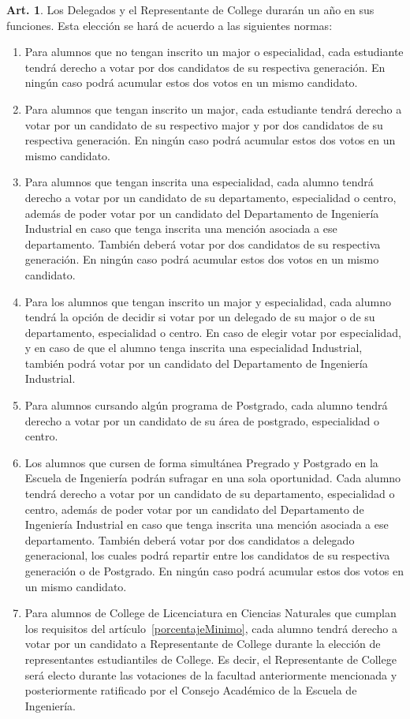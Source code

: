 \documentclass[letterpaper,11pt]{article}
\theoremstyle{definition}%
\newtheorem{art}{Art.} %
\begin{document}
\begin{art}\label{definicionesDelegados}
	Los Delegados y el Representante de College durarán un año en sus funciones. Esta elección se hará de acuerdo a las siguientes normas:
	\begin{enumerate}
		\item Para alumnos que no tengan inscrito un major o especialidad, cada estudiante tendrá derecho a votar por dos candidatos de su respectiva generación. En ningún caso podrá acumular estos dos votos en un mismo candidato.
		\item Para alumnos que tengan inscrito un major, cada estudiante tendrá derecho a votar por un candidato de su respectivo major y por dos candidatos de su respectiva generación. En ningún caso podrá acumular estos dos votos en un mismo candidato.
		\item Para alumnos que tengan inscrita una especialidad, cada alumno tendrá derecho a votar por un candidato de su departamento, especialidad o centro, además de poder votar por un candidato del Departamento de Ingeniería Industrial en caso que tenga inscrita una mención asociada a ese departamento. También deberá votar por dos candidatos de su respectiva generación. En ningún caso podrá acumular estos dos votos en un mismo candidato.
		\item Para los alumnos que tengan inscrito un major y especialidad, cada alumno tendrá la opción de decidir si votar por un delegado de su major o de su departamento, especialidad o centro. En caso de elegir votar por especialidad, y en caso de que el alumno tenga inscrita una especialidad Industrial, también podrá votar por un candidato del Departamento de Ingeniería Industrial.
		\item Para alumnos cursando algún programa de Postgrado, cada alumno tendrá derecho a votar por un candidato de su área de postgrado, especialidad o centro.
		\item Los alumnos que cursen de forma simultánea Pregrado y Postgrado en la Escuela de Ingeniería podrán sufragar en una sola oportunidad. Cada alumno tendrá derecho a votar por un candidato de su departamento, especialidad o centro, además de poder votar por un candidato del Departamento de Ingeniería Industrial en caso que tenga inscrita una mención asociada a ese departamento. También deberá votar por dos candidatos a delegado generacional, los cuales podrá repartir entre los candidatos de su respectiva generación o de Postgrado. En ningún caso podrá acumular estos dos votos en un mismo candidato.
		\item Para alumnos de College de Licenciatura en Ciencias Naturales que cumplan los requisitos del artículo~\ref{porcentajeMinimo}, cada alumno tendrá derecho a votar por un candidato a Representante de College durante la elección de representantes estudiantiles de College. Es decir, el Representante de College será electo durante las votaciones de la facultad anteriormente mencionada y posteriormente ratificado por el Consejo Académico de la Escuela de Ingeniería.

\end{enumerate}
\end{art}
\end{document}

